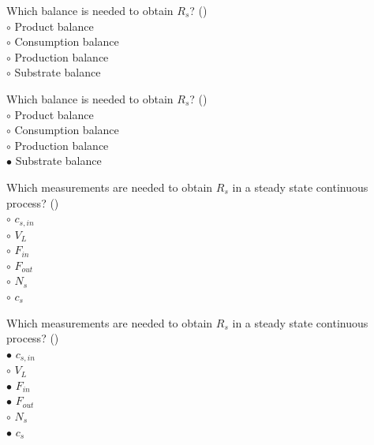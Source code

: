 \documentclass[]{beamer}
\begin{document}
\begin{frame}[shrink] {}
\addtocounter{questions}{1}
\color{blue}
Which balance is needed to obtain $R_s$? ()\\[0.3em]
\color{black}
\setlength{\parindent}{-0.4cm}
{\color{red}$\circ$}  Product balance  \\
{\color{red}$\circ$} Consumption balance\\
{\color{red}$\circ$} Production balance \\
{\color{red}$\circ$} Substrate balance
\end{frame}
\begin{frame}[shrink] {}
\addtocounter{answers}{1}
\color{blue}
Which balance is needed to obtain $R_s$? ()\\[0.3em]
\color{black}
\setlength{\parindent}{-0.4cm}
{\color{red}$\circ$}  Product balance  \\
{\color{red}$\circ$} Consumption balance\\
{\color{red}$\circ$} Production balance \\
{\color{red}$\bullet$} Substrate balance
\end{frame}

\begin{frame}[shrink] {}
\addtocounter{questions}{1}
\color{blue}
Which measurements are needed to obtain $R_s$ in a steady state continuous process?  ()\\
\color{black}
\setlength{\parindent}{-0.4cm}
{\color{red}$\circ$}  $c_{s,in}$\\
{\color{red}$\circ$} $V_L$\\
{\color{red}$\circ$} $F_{in}$\\
{\color{red}$\circ$} $F_{out}$\\
{\color{red}$\circ$} $N_s$\\
{\color{red}$\circ$} $c_s$
\end{frame}
\begin{frame}[shrink] {}
\addtocounter{answers}{1}
\color{blue}
Which measurements are needed to obtain $R_s$ in a steady state continuous process?  ()\\
\color{black}
\setlength{\parindent}{-0.4cm}
{\color{red}$\bullet$}  $c_{s,in}$\\
{\color{red}$\circ$} $V_L$\\
{\color{red}$\bullet$} $F_{in}$\\
{\color{red}$\bullet$} $F_{out}$\\
{\color{red}$\circ$} $N_s$\\
{\color{red}$\bullet$} $c_s$
\end{frame}
\end{document}
